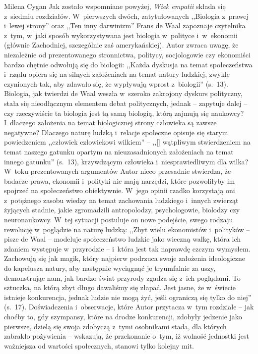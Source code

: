 \begin{recplenv}{Milena Cygan}
Jak zostało wspomniane powyżej, \textit{Wiek empatii} składa się z~siedmiu rozdziałów. W~pierwszych dwóch,
zatytułowanych ,,Biologia z~prawej i~lewej strony'' oraz ,,Ten inny darwinizm'' Frans de Waal zapoznaje
czytelnika z~tym, w~jaki sposób wykorzystywana jest biologia w~polityce i~w~ekonomii (głównie Zachodniej,
szczególnie zaś amerykańskiej).
Autor zwraca uwagę, że niezależnie od prezentowanego stronnictwa, politycy, socjologowie czy ekonomiści bardzo chętnie
odwołują się do biologii: ,,Każda dyskusja na temat społeczeństwa i~rządu opiera się na silnych założeniach na temat
natury ludzkiej, zwykle czynionych tak, aby zdawało się, że wypływają wprost z~biologii'' (s.~13). Biologia, jak
twierdzi de Waal weszła w~szeroko zakrojony dyskurs polityczny, stała się nieodłącznym elementem debat politycznych,
jednak -- zapytuje dalej -- czy rzeczywiście ta biologia jest tą samą biologią, którą zajmują się naukowcy? I~dlaczego
założenia na temat biologicznej strony człowieka są zawsze negatywne? Dlaczego naturę ludzką i~relacje społeczne
opisuje się starym powiedzeniem ,,człowiek człowiekowi wilkiem'' -- ,,[\mydots] wątpliwym stwierdzeniem na temat naszego gatunku
opartym na nieuzasadnionych założeniach na temat innego gatunku'' (s.~13), krzywdzącym człowieka i~niesprawiedliwym dla
wilka? W~toku prezentowanych argumentów Autor nieco przesadnie stwierdza, że badacze prawa, ekonomii i~polityki nie
mają narzędzi, które pozwoliłyby im spojrzeć na społeczeństwo obiektywnie. W~jego opinii rzadko korzystają
oni z~potężnego zasobu wiedzy na temat zachowania ludzkiego i~innych zwierząt żyjących stadnie, jakie zgromadzili
antropolodzy, psychologowie, biolodzy czy neuronaukowcy. W~tej sytuacji postuluje on nowe podejście, swego rodzaju
rewolucję w~poglądzie na naturę ludzką: ,,Zbyt wielu ekonomistów i~polityków -- pisze de Waal -- modeluje społeczeństwo
ludzkie jako wieczną walkę, która ich zdaniem występuje w~przyrodzie -- i~która jest tak naprawdę czczym wymysłem.
Zachowują się jak magik, który najpierw podrzuca swoje założenia ideologiczne do kapelusza natury, aby następnie
wyciągnąć je tryumfalnie za uszy, demonstrując nam, jak bardzo świat przyrody zgadza się z~ich poglądami. To sztuczka,
na którą zbyt długo dawaliśmy się złapać. Jest jasne, że w~świecie istnieje konkurencja, jednak ludzie nie mogą żyć,
jeśli ograniczą się tylko do niej'' (s.~17). Doświadczenia i~obserwacje, które Autor przytacza w~tym rozdziale -- jak
choćby to, gdy szympansy, które na drodze konkurencji, zdobyły jedzenie jako pierwsze, dzielą się swoja zdobyczą z~tymi
osobnikami stada, dla których zabrakło pożywienia -- wskazują, że przekonanie o~tym, iż wolność jednostki jest
ważniejsza od wartości społecznych, stanowi tylko kolejny mit.


\end{recplenv}
